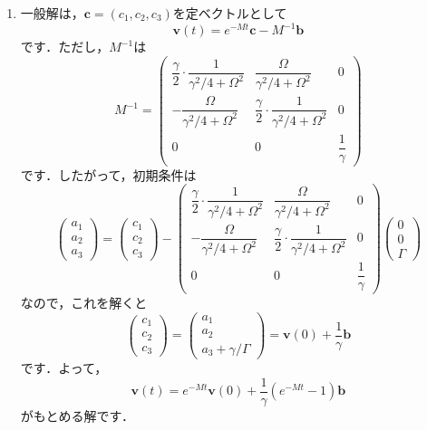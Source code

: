 \documentclass[a4paper,pdflatex,ja=standard]{bxjsarticle}
\begin{document}
\begin{enumerate}
  \item 
  一般解は，$\bm{c}=(c_1,c_2,c_3)$を定ベクトルとして
  \begin{equation}
    \bm{v}(t)
    =
    e^{-Mt}\bm{c}
    -
    M^{-1}\bm{b}
  \end{equation}
  です．ただし，$M^{-1}$は
  \begin{equation}
    M^{-1}
    =
    \begin{pmatrix}
      \dfrac{\gamma}{2}\cdot\dfrac{1}{\gamma^2/4+\Omega^2}
      &
      \dfrac{\Omega}{\gamma^2/4+\Omega^2}
      &
      0
      \\
      -\dfrac{\Omega}{\gamma^2/4+\Omega^2}
      &
      \dfrac{\gamma}{2}\cdot\dfrac{1}{\gamma^2/4+\Omega^2}
      &
      0
      \\
      0 & 0 & \dfrac{1}{\gamma}
    \end{pmatrix}
  \end{equation}
  です．したがって，初期条件は
  \begin{equation}
    \begin{pmatrix}
      a_1 \\
      a_2 \\
      a_3
    \end{pmatrix}
    =
    \begin{pmatrix}
      c_1 \\
      c_2 \\
      c_3
    \end{pmatrix}
    -
    \begin{pmatrix}
      \dfrac{\gamma}{2}\cdot\dfrac{1}{\gamma^2/4+\Omega^2}
      &
      \dfrac{\Omega}{\gamma^2/4+\Omega^2}
      &
      0
      \\
      -\dfrac{\Omega}{\gamma^2/4+\Omega^2}
      &
      \dfrac{\gamma}{2}\cdot\dfrac{1}{\gamma^2/4+\Omega^2}
      &
      0
      \\
      0 & 0 & \dfrac{1}{\gamma}
    \end{pmatrix}
    \begin{pmatrix}
      0 \\
      0 \\
      \Gamma
    \end{pmatrix}
  \end{equation}
  なので，これを解くと
  \begin{equation}
    \begin{pmatrix}
      c_1 \\
      c_2 \\
      c_3
    \end{pmatrix}
    =
    \begin{pmatrix}
      a_1 \\
      a_2 \\
      a_3 + \gamma/\Gamma
    \end{pmatrix}
    =
    \bm{v}(0)
    +
    \frac{1}{\gamma}\bm{b}
  \end{equation}
  です．よって，
  \begin{equation}
    \bm{v}(t)
    =
    e^{-Mt}\bm{v}(0)
    +
    \frac{1}{\gamma}(e^{-Mt}-1)\bm{b}
  \end{equation}
  がもとめる解です．

\end{enumerate}
\end{document}
